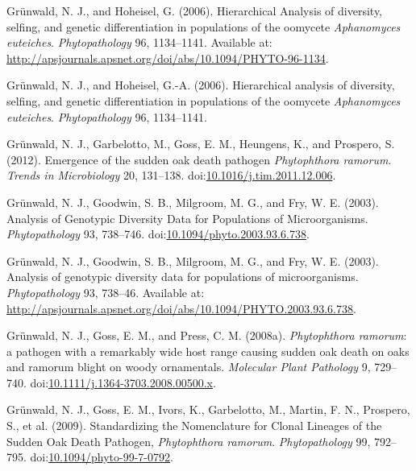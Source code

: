 \documentclass[double,12pt]{beavtex}
\begin{document}
  \hypertarget{ref-Grunwald:2006}{}
  Grünwald, N. J., and Hoheisel, G. (2006). Hierarchical Analysis of
  diversity, selfing, and genetic differentiation in populations of the
  oomycete \emph{Aphanomyces euteiches}. \emph{Phytopathology} 96,
  1134--1141. Available at:
  \url{http://apsjournals.apsnet.org/doi/abs/10.1094/PHYTO-96-1134}.
  
  \hypertarget{ref-grunwald2006hierarchical}{}
  Grünwald, N. J., and Hoheisel, G.-A. (2006). Hierarchical analysis of
  diversity, selfing, and genetic differentiation in populations of the
  oomycete \emph{Aphanomyces euteiches}. \emph{Phytopathology} 96,
  1134--1141.
  
  \hypertarget{ref-grunwald2012emergence}{}
  Grünwald, N. J., Garbelotto, M., Goss, E. M., Heungens, K., and
  Prospero, S. (2012). Emergence of the sudden oak death pathogen
  \emph{Phytophthora ramorum}. \emph{Trends in Microbiology} 20, 131--138.
  doi:\href{https://doi.org/10.1016/j.tim.2011.12.006}{10.1016/j.tim.2011.12.006}.
  
  \hypertarget{ref-grunwald2003analysis}{}
  Grünwald, N. J., Goodwin, S. B., Milgroom, M. G., and Fry, W. E. (2003).
  Analysis of Genotypic Diversity Data for Populations of Microorganisms.
  \emph{Phytopathology} 93, 738--746.
  doi:\href{https://doi.org/10.1094/phyto.2003.93.6.738}{10.1094/phyto.2003.93.6.738}.
  
  \hypertarget{ref-Grunwald:2003}{}
  Grünwald, N. J., Goodwin, S. B., Milgroom, M. G., and Fry, W. E. (2003).
  Analysis of genotypic diversity data for populations of microorganisms.
  \emph{Phytopathology} 93, 738--46. Available at:
  \url{http://apsjournals.apsnet.org/doi/abs/10.1094/PHYTO.2003.93.6.738}.
  
  \hypertarget{ref-grunwald2008phytophthora}{}
  Grünwald, N. J., Goss, E. M., and Press, C. M. (2008a).
  \emph{Phytophthora ramorum}: a pathogen with a remarkably wide host
  range causing sudden oak death on oaks and ramorum blight on woody
  ornamentals. \emph{Molecular Plant Pathology} 9, 729--740.
  doi:\href{https://doi.org/10.1111/j.1364-3703.2008.00500.x}{10.1111/j.1364-3703.2008.00500.x}.
  
  \hypertarget{ref-grunwald2009standardizing}{}
  Grünwald, N. J., Goss, E. M., Ivors, K., Garbelotto, M., Martin, F. N.,
  Prospero, S., et al. (2009). Standardizing the Nomenclature for Clonal
  Lineages of the Sudden Oak Death Pathogen, \emph{Phytophthora ramorum}.
  \emph{Phytopathology} 99, 792--795.
  doi:\href{https://doi.org/10.1094/phyto-99-7-0792}{10.1094/phyto-99-7-0792}.
  
\end{document}
